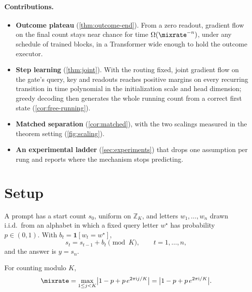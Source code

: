 \paragraph{Contributions.}
\begin{itemize}[leftmargin=*,itemsep=1pt,topsep=2pt]
\item \textbf{Outcome plateau} (\cref{thm:outcome-end}). From a zero readout, gradient flow on the final count stays near chance for time
$\Omega(\mixrate^{-n})$, under any schedule of trained blocks, in a Transformer wide enough to hold the outcome executor.
\item \textbf{Step learning} (\cref{thm:joint}). With the routing fixed, joint gradient flow on the gate's query, key and readouts reaches
positive margins on every recurring transition in time polynomial in the initialization scale and head dimension; greedy decoding then
generates the whole running count from a correct first state (\cref{cor:free-running}).
\item \textbf{Matched separation} (\cref{cor:matched}), with the two scalings measured in the theorem setting (\cref{fig:scaling}).
\item \textbf{An experimental ladder} (\cref{sec:experiments}) that drops one assumption per rung and reports where the mechanism stops predicting.
\end{itemize}

\section{Setup}
\label{sec:setup}
\label{sec:setting}

\begin{definition}
\label{def:task}
A prompt has a start count $s_0$, uniform on $\mathbb Z_K$, and letters $w_1,\ldots,w_n$ drawn i.i.d.\ from an alphabet
in which a fixed query letter $w^\star$ has probability $p\in(0,1)$. With $b_t=\mathbf 1[w_t=w^\star]$,
\begin{equation}
 s_t=s_{t-1}+b_t\pmod K,\qquad t=1,\ldots,n,
 \label{eq:tracking}
\end{equation}
and the answer is $y=s_n$.
\end{definition}

\begin{definition}
\label{def:lambda}
For counting modulo $K$,
\begin{equation}
 \mixrate=\max_{1\le j<K}\bigl|1-p+p\,e^{2\pi\mathrm ij/K}\bigr|=\bigl|1-p+p\,e^{2\pi\mathrm i/K}\bigr|.
 \label{eq:lambda}
\end{equation}
\end{definition}

